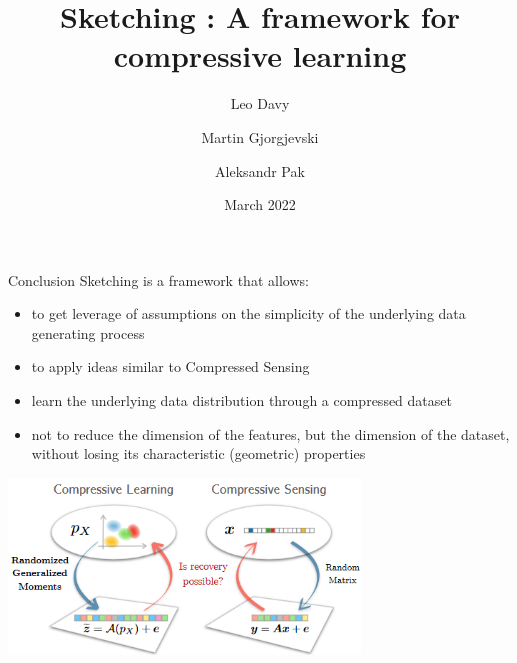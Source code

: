 \documentclass{beamer}
\title[Sketching and compressive learning]{Sketching : A framework for compressive learning}
\author[Davy, Gjorgjevski, Pak] %
{Leo Davy \and Martin Gjorgjevski \and Aleksandr Pak}
\institute[ENS Lyon] %
{
  ENS Lyon \\
  M2 Advanced Mathematics}
\date[Short Occasion] %
{March 2022}
\begin{document}
\maketitle










\begin{frame}{Conclusion}
	Sketching is a framework that allows:
	\begin{itemize}
		\item to get leverage of assumptions on the simplicity of the underlying data generating process
		\item to apply ideas similar to Compressed Sensing
		\item learn the underlying data distribution through a compressed dataset
		\item not to reduce the dimension of the features, but the dimension of the dataset, without losing its characteristic (geometric) properties
	\end{itemize}
	\center
	\includegraphics[height=0.4\textheight, width=0.7\textwidth]{CS}
\end{frame}
\end{document}
